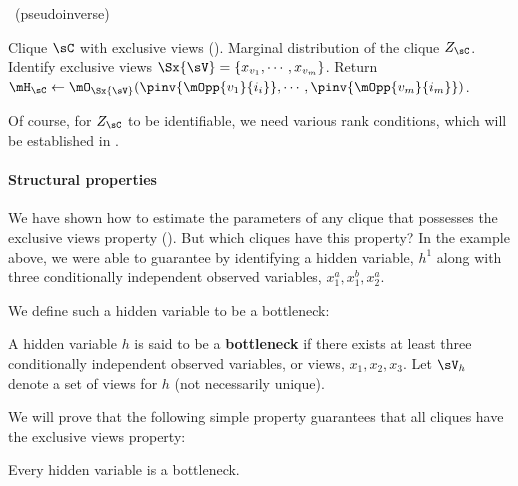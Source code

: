 \renewcommand{\algorithmicrequire}{\textbf{Input:}}
\renewcommand{\algorithmicensure}{\textbf{Output:}}
\begin{algorithm}
  \caption{\LearnClique~(pseudoinverse)}
  \label{algo:learnclique}
  \begin{algorithmic}
    \REQUIRE Clique $\sC$ with exclusive views ().
    \ENSURE Marginal distribution of the clique $Z_\sC$.
      \STATE Identify exclusive views $\Sx{\sV} = \{x_{v_1}, \cdots, x_{v_m}\}$.
      \STATE Return $\mH_\sC \gets \mO_{\Sx{\sV}}( \pinv{\mOpp{v_1}{i_i}}, \cdots, \pinv{\mOpp{v_m}{i_m}} )$.
  \end{algorithmic}
\end{algorithm}
Of course, for $Z_{\sC}$ to be identifiable, we need various rank conditions,
which will be established in .

\paragraph{Structural properties}

We have shown how to estimate the parameters of any clique that possesses the exclusive
  views property ().  But which cliques have this property?
In the example above, we were able to guarantee 
  by identifying a hidden variable, $h^1$ along with three conditionally
  independent observed variables, $x^a_1, x^b_1, x^a_2$.

We define such a hidden variable to be a bottleneck:
\begin{definition}[Bottleneck]
  A hidden variable $h$ is said to be a \textbf{bottleneck} if there exists at
    least three conditionally independent observed variables, or views,
    $x_1, x_2, x_3$. 
  Let $\sV_{h}$ denote a set of views for $h$ (not necessarily unique).
\end{definition}

We will prove that the following simple property guarantees that all cliques
have the exclusive views property:
\begin{property}
  \label{prop:bottleneck}
  Every hidden variable is a bottleneck.
\end{property}


